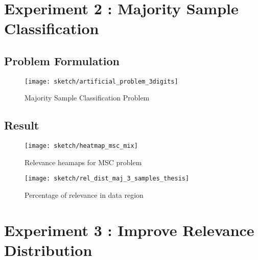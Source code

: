 \section{Experiment 2 : Majority Sample Classification}
\subsection{Problem Formulation}

 \begin{figure}[h]
\centering
\texttt{[image: sketch/artificial\_problem\_3digits]}
\caption{Majority Sample Classification Problem} 
\label{fig:artificial_problem_3digits}
\end{figure}

\subsection{Result}
 \begin{figure}[h]
\centering
\texttt{[image: sketch/heatmap\_msc\_mix]}
\caption{Relevance heamaps for MSC problem} 
\label{fig:heatmap_msc_mix}
\end{figure}

 \begin{figure}[h]
\centering
\texttt{[image: sketch/rel\_dist\_maj\_3\_samples\_thesis]}
\caption{Percentage of relevance in data region} 
\label{fig:rel_dist_maj_3_samples_thesis}
\end{figure}


\section{Experiment 3 : Improve Relevance Distribution}



